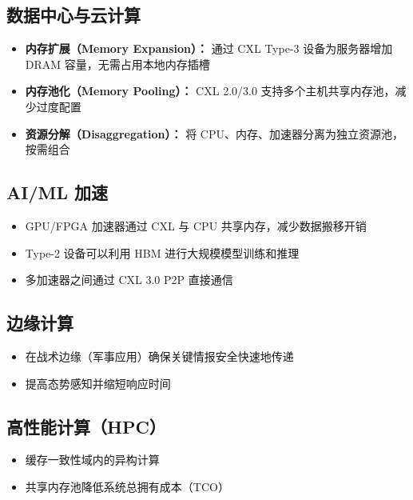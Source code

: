 \documentclass[12pt,a4paper]{article}
\begin{document}
\subsection{数据中心与云计算}

\begin{itemize}
    \item \textbf{内存扩展（Memory Expansion）：} 通过 CXL Type-3 设备为服务器增加 DRAM 容量，无需占用本地内存插槽
    \item \textbf{内存池化（Memory Pooling）：} CXL 2.0/3.0 支持多个主机共享内存池，减少过度配置
    \item \textbf{资源分解（Disaggregation）：} 将 CPU、内存、加速器分离为独立资源池，按需组合
\end{itemize}

\subsection{AI/ML 加速}

\begin{itemize}
    \item GPU/FPGA 加速器通过 CXL 与 CPU 共享内存，减少数据搬移开销
    \item Type-2 设备可以利用 HBM 进行大规模模型训练和推理
    \item 多加速器之间通过 CXL 3.0 P2P 直接通信
\end{itemize}

\subsection{边缘计算}

\begin{itemize}
    \item 在战术边缘（军事应用）确保关键情报安全快速地传递
    \item 提高态势感知并缩短响应时间
\end{itemize}

\subsection{高性能计算（HPC）}

\begin{itemize}
    \item 缓存一致性域内的异构计算
    \item 共享内存池降低系统总拥有成本（TCO）
\end{itemize}

\end{document}
